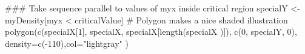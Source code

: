 \begin{Schunk}
\begin{Sinput}
 ### Take sequence parallel to values of myx inside critical region
 specialY <- myDensity[myx < criticalValue]
 #  Polygon makes a nice shaded illustration
 polygon(c(specialX[1], specialX, specialX[length(specialX )]), c(0, specialY, 0), density=c(-110),col="lightgray" )
\end{Sinput}
\end{Schunk}
